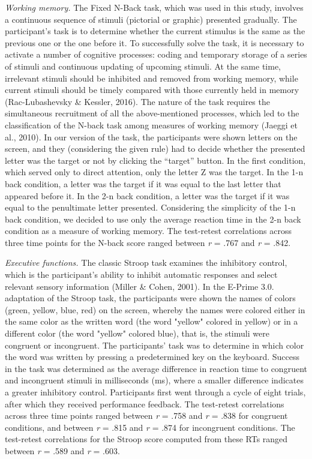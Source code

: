 \documentclass[authordate, empirical]{jote-new-article}
\begin{document}
\emph{Working memory. }The Fixed N-Back task, which was used in this study, involves a continuous sequence of stimuli (pictorial or graphic) presented gradually. The participant's task is to determine whether the current stimulus is the same as the previous one or the one before it. To successfully solve the task, it is necessary to activate a number of cognitive processes: coding and temporary storage of a series of stimuli and continuous updating of upcoming stimuli. At the same time, irrelevant stimuli should be inhibited and removed from working memory, while current stimuli should be timely compared with those currently held in memory (Rac-Lubashevsky \& Kessler, 2016). The nature of the task requires the simultaneous recruitment of all the above-mentioned processes, which led to the classification of the N-back task among measures of working memory (Jaeggi et al., 2010). In our version of the task, the participants were shown letters on the screen, and they (considering the given rule) had to decide whether the presented letter was the target or not by clicking the “target” button. In the first condition, which served only to direct attention, only the letter Z was the target. In the 1-n back condition, a letter was the target if it was equal to the last letter that appeared before it. In the 2-n back condition, a letter was the target if it was equal to the penultimate letter presented. Considering the simplicity of the 1-n back condition, we decided to use only the average reaction time in the 2-n back condition as a measure of working memory. The test-retest correlations across three time points for the N-back score ranged between \emph{r} = .767 and \emph{r} = .842.



\emph{Executive functions. }The classic Stroop task examines the inhibitory control, which is the participant's ability to inhibit automatic responses and select relevant sensory information (Miller \& Cohen, 2001). In the E-Prime 3.0. adaptation of the Stroop task, the participants were shown the names of colors (green, yellow, blue, red) on the screen, whereby the names were colored either in the same color as the written word (the word "yellow" colored in yellow) or in a different color (the word "yellow" colored blue), that is, the stimuli were congruent or incongruent. The participants' task was to determine in which color the word was written by pressing a predetermined key on the keyboard. Success in the task was determined as the average difference in reaction time to congruent and incongruent stimuli in milliseconds (ms), where a smaller difference indicates a greater inhibitory control. Participants first went through a cycle of eight trials, after which they received performance feedback. The test-retest correlations across three time points ranged between \emph{r} = .758 and \emph{r} = .838 for congruent conditions, and between \emph{r} = .815 and \emph{r} = .874 for incongruent conditions. The test-retest correlations for the Stroop score computed from these RTs ranged between \emph{r} = .589 and \emph{r} = .603.
\end{document}
